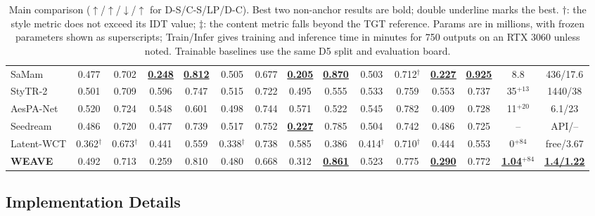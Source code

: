 \documentclass[letterpaper]{article} %
\begin{document}
\begin{table}[t]
{\begin{tabular}{@{}lcccccccccccccc@{}}
SaMam & 0.477 & 0.702 & \underline{\textbf{0.248}} & \underline{\textbf{0.812}} & 0.505 & 0.677 & \underline{\underline{\textbf{0.205}}} & \underline{\underline{\textbf{0.870}}} & 0.503 & 0.712$^{\dagger}$ & \underline{\underline{\textbf{0.227}}} & \underline{\underline{\textbf{0.925}}} & 8.8 & 436/17.6 \\
StyTR-2 & 0.501 & 0.709 & 0.596 & 0.747 & 0.515 & 0.722 & 0.495 & 0.555 & 0.533 & 0.759 & 0.553 & 0.737 & 35$^{+13}$ & 1440/38 \\
AesPA-Net & 0.520 & 0.724 & 0.548 & 0.601 & 0.498 & 0.744 & 0.571 & 0.522 & 0.545 & 0.782 & 0.409 & 0.728 & 11$^{+20}$ & 6.1/23 \\
Seedream & 0.486 & 0.720 & 0.477 & 0.739 & 0.517 & 0.752 & \underline{\textbf{0.227}} & 0.785 & 0.504 & 0.742 & 0.486 & 0.725 & -- & API/-- \\
Latent-WCT & 0.362$^{\dagger}$ & 0.673$^{\dagger}$ & 0.441 & 0.559 & 0.338$^{\dagger}$ & 0.738 & 0.585 & 0.386 & 0.414$^{\dagger}$ & 0.710$^{\dagger}$ & 0.444 & 0.553 & 0$^{+84}$ & free/3.67 \\
\midrule
\textbf{WEAVE} & 0.492 & 0.713 & 0.259 & 0.810 & 0.480 & 0.668 & 0.312 & \underline{\textbf{0.861}} & 0.523 & 0.775 & \underline{\textbf{0.290}} & 0.772 & \underline{\underline{\textbf{1.04$^{+84}$}}} & \underline{\underline{\textbf{1.4/1.22}}} \\
\bottomrule
\end{tabular}
}
\caption{Main comparison ($\uparrow$/$\uparrow$/$\downarrow$/$\uparrow$ for D-S/C-S/LP/D-C). Best two non-anchor results are bold; double underline marks the best. $\dagger$: the style metric does not exceed its IDT value;
$\ddagger$: the content metric falls beyond the TGT reference. Params are in millions, with frozen parameters shown as superscripts; Train/Infer gives training and inference time in minutes for 750 outputs on an RTX 3060 unless noted. Trainable baselines use the same D5 split and evaluation board.}
\label{tab:main}
\end{table}


\subsection{Implementation Details}
\label{sec:setup}
\end{document}
